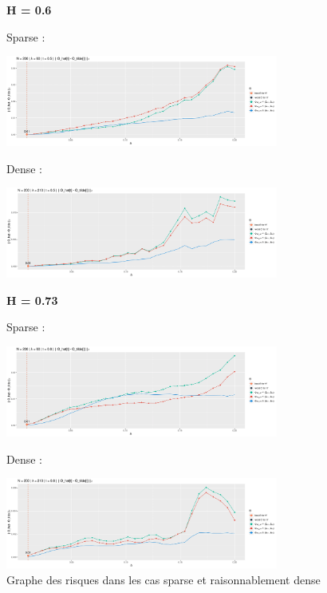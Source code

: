 \begin{figure}[H]
	\centering
	\textbf{ H = 0.6 }

	Sparse :

	\includegraphics[width=0.8\textwidth]{Images/risque/N200_t0.5_lbd60.jpg}

	Dense :

	\includegraphics[width=0.8\textwidth]{Images/risque/N200_t0.5_lbd210.jpg}
\end{figure}


\begin{figure}[H]
	\centering
	\textbf{ H = 0.73 }

	Sparse :

	\includegraphics[width=0.8\textwidth]{Images/risque/N200_t0.8_lbd60.jpg}

	Dense :

	\includegraphics[width=0.8\textwidth]{Images/risque/N200_t0.8_lbd210.jpg}

	\label{fig:sparse_osef}
	\caption{Graphe des risques dans les cas \og sparse \fg et \og raisonnablement dense \fg}
\end{figure}
